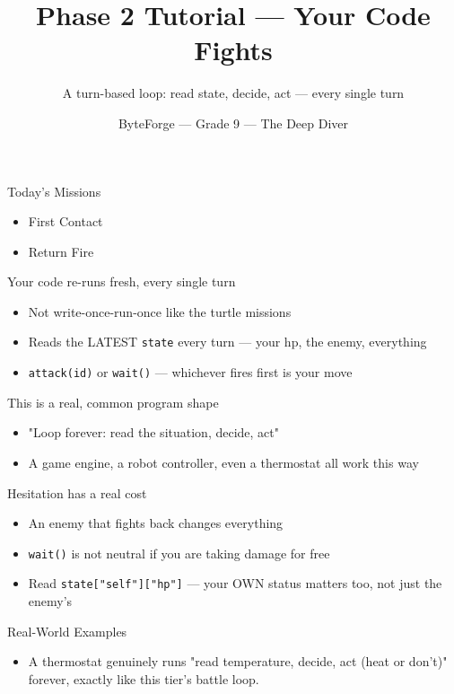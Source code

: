 \documentclass[aspectratio=169]{beamer}
\title{Phase 2 Tutorial — Your Code Fights}
\subtitle{A turn-based loop: read state, decide, act --- every single turn}
\author{ByteForge --- Grade 9 --- The Deep Diver}
\date{}
\begin{document}
\begin{frame}
    \titlepage
\end{frame}

\begin{frame}{Today's Missions}
    \Large
    \begin{itemize}
        \item First Contact
        \item Return Fire
    \end{itemize}
\end{frame}

\begin{frame}{Your code re-runs fresh, every single turn}
    \large
    \begin{itemize}
        \item Not write-once-run-once like the turtle missions
        \item Reads the LATEST \texttt{state} every turn --- your hp, the enemy, everything
        \item \texttt{attack(id)} or \texttt{wait()} --- whichever fires first is your move
    \end{itemize}
\end{frame}


\begin{frame}{This is a real, common program shape}
    \large
    \begin{itemize}
        \item "Loop forever: read the situation, decide, act"
        \item A game engine, a robot controller, even a thermostat all work this way
    \end{itemize}
\end{frame}


\begin{frame}{Hesitation has a real cost}
    \large
    \begin{itemize}
        \item An enemy that fights back changes everything
        \item \texttt{wait()} is not neutral if you are taking damage for free
        \item Read \texttt{state["self"]["hp"]} --- your OWN status matters too, not just the enemy's
    \end{itemize}
\end{frame}

\begin{frame}{Real-World Examples}
    \large
    \begin{itemize}
        \item A thermostat genuinely runs "read temperature, decide, act (heat or don't)" forever, exactly like this tier's battle loop.
    \end{itemize}
\end{frame}
\end{document}
